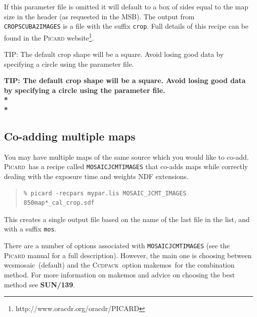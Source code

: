 \documentclass[twoside,11pt]{article}
\newcommand{\htmladdnormallink}[2]{#1}
\newenvironment{latexonly}{}{}
\newcommand{\latex}[1]{#1}
\newcommand{\xref}[3]{#1}
\newcommand{\xlabel}[1]{}
\renewcommand{\_}{\texttt{\symbol{95}}}
\newenvironment{fmpage}[1]{\begin{lrbox}{\fmbox}\begin{minipage}{#1}}{\end{minipage}\end{lrbox}\fbox{\usebox{\fmbox}}}
\newenvironment{myquote}{\begin{quote}\begin{small}}{\end{small}\end{quote}}
\newcommand{\ccdpack}{\xref{\textsc{Ccdpack}}{sun139}{}}
\newcommand{\picard}{\xref{\textsc{Picard}}{sun265}{}}
\newcommand{\drrecipe}[1]{\texttt{#1}}
\newcommand{\task}[1]{\textsf{#1}}
\newcommand{\wcsmosaic}{\xref{\task{wcsmosaic}}{sun95}{WCSMOSAIC}}
\newcommand{\makemos}{\xref{\task{makemos}}{sun139}{MAKEMOS}}
\begin{document}
If this parameter file is omitted it will default to a box of sides
equal to the map size in the header (as requested in the MSB). The
output from \drrecipe{CROP\_SCUBA2\_IMAGES} is a file with the suffix
\texttt{\_crop}. Full details of this recipe can be found in the
\htmladdnormallink{\textsc{Picard}
website}{http://www.oracdr.org/oracdr/PICARD}\latex{\footnote{http://www.oracdr.org/oracdr/PICARD}}.

\begin{latexonly}
\begin{center}
\begin{fmpage}{0.95\linewidth}
\vspace{0.1cm}
TIP: The default crop shape will be a square. Avoid losing good data
by specifying a circle using the parameter file.
\end{fmpage}
\end{center}
\end{latexonly}

\begin{htmlonly}
\textbf{TIP: The default crop shape will be a square. Avoid losing
good data by specifying a circle using the parameter file.\\*\\*}
\end{htmlonly}


\subsection{\xlabel{coadd}Co-adding multiple maps}
\label{sec:coadd}

You may have multiple maps of the same source which you would like to
co-add. \picard\ has a recipe called
\xref{\drrecipe{MOSAIC\_JCMT\_IMAGES}}{sun265}{MOSAIC_JCMT_IMAGES}
that co-adds maps while correctly dealing with the exposure time and
weights NDF extensions.
\begin{myquote}
\begin{verbatim}
% picard -recpars mypar.lis MOSAIC_JCMT_IMAGES 850map*_cal_crop.sdf
\end{verbatim}
\end{myquote}
This creates a single output file based on the name of the last file
in the list, and with a suffix \texttt{\_mos}.

There are a number of options associated with
\drrecipe{MOSAIC\_JCMT\_IMAGES} (see the \textsc{Picard} manual for a full
description). However, the main one is choosing between \wcsmosaic\
(default) and the \ccdpack\ option \makemos\ for the combination
method. For more information on \task{makemos} and advice on choosing the
best method see \xref{\textbf{SUN/139}}{sun139}{}.
\end{document}
